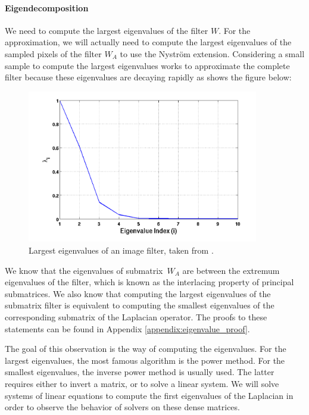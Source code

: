 \paragraph{Eigendecomposition}
We need to compute the largest eigenvalues of the filter \(W\).
For the approximation, we will actually need to compute the largest eigenvalues of the sampled pixels of the filter \(W_A\) to use the Nystr\"om extension.
Considering a small sample to compute the largest eigenvalues works to approximate the complete filter because these eigenvalues are decaying rapidly as shows the figure below:
\begin{figure}[H]
  \centering
  \includegraphics[width=0.9\textwidth]{img/decayingEigenvalues.png}
  \caption{Largest eigenvalues of an image filter, taken from \cite{siam_slides_2016}.}
\end{figure}

We know that the eigenvalues of submatrix\ \(W_A\) are between the extremum eigenvalues of the filter, which is known as the interlacing property of principal submatrices.
We also know that computing the largest eigenvalues of the submatrix filter is equivalent to computing the smallest eigenvalues of the corresponding submatrix of the Laplacian operator.
The proofs to these statements can be found in Appendix \ref{appendix:eigenvalue_proof}.

The goal of this observation is the way of computing the eigenvalues.
For the largest eigenvalues, the most famous algorithm is the power method.
For the smallest eigenvalues, the inverse power method is usually used.
The latter requires either to invert a matrix, or to solve a linear system.
We will solve systems of linear equations to compute the first eigenvalues of the Laplacian in order to observe the behavior of solvers on these dense matrices.

